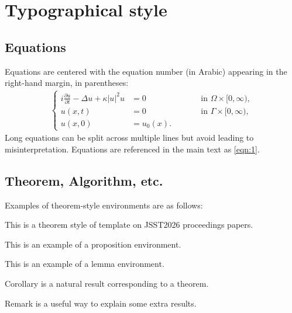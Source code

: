 \documentclass[proceedings]{jasse-modern}%
\begin{document}
\section{Typographical style}
\subsection{Equations}
Equations are centered with the equation number (in Arabic) appearing in the right-hand margin, in
parentheses:
\begin{align}\label{eqn:1}
  \left\{
  \begin{alignedat}{2}
    i\frac{\partial u}{\partial t}-\Delta u+\kappa|u|^2u &= 0
      &\qquad& \text{in } \Omega\times[0,\infty),\\[2mm]
    u(x,t) &= 0
      && \text{in } \Gamma\times[0,\infty),\\[2mm]
    u(x,0) &= u_0(x).
  \end{alignedat}
  \right.
\end{align}
Long equations can be split across multiple lines but avoid leading to misinterpretation.
Equations are referenced in the main text as \eqref{eqn:1}.

\subsection{Theorem, Algorithm, etc.}
Examples of theorem-style environments are as follows:

\begin{theorem}
This is a theorem style of template on JSST2026 proceedings papers.
\end{theorem}

\begin{proposition}
This is an example of a proposition environment.
\end{proposition}

\begin{lemma}
This is an example of a lemma environment.
\end{lemma}

\begin{corollary}
Corollary is a natural result corresponding to a theorem.
\end{corollary}

\begin{remark}
Remark is a useful way to explain some extra results.
\end{remark}
\end{document}
